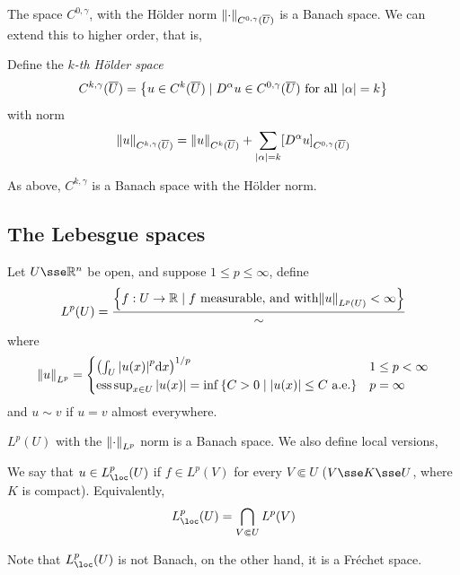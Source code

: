 \documentclass{article}
\begin{document}
The space \(C^{0, \gamma}\), with the H\"older norm \(\norm{\cdot}_{C^{0, \gamma}(\overline U)}\) is a Banach space. We can extend this to higher order, that is,

\begin{definition}
    Define the \emph{\(k\)-th H\"older space}
    \[C^{k, \gamma}(\overline U) = \left\{u \in C^k(\overline U) \mid D^\alpha u \in C^{0, \gamma}(\overline U) \text{ for all }\abs{\alpha} = k\right\}\]
    with norm
    \[\norm{u}_{C^{k, \gamma}(\overline U)} = \norm{u}_{C^k(\overline U)} + \sum_{\abs{\alpha} = k}[D^\alpha u]_{C^{0, \gamma}(\overline U)}\]
\end{definition}

As above, \(C^{k, \gamma}\) is a Banach space with the H\"older norm.

\subsection{The Lebesgue spaces}


\begin{definition}
    [\(L^p\) space]
    Let \(U \sse \R^n\) be open, and suppose \(1 \le p \le \infty\), define 
    \[L^p(U) = \frac{\left\{f : U \to \mathbb{R} \mid f \text{ measurable, and with} \norm{u}_{L^p(U)} < \infty\right\}}{\sim}\]
    where
    \[\norm{u}_{L^p} = \begin{cases}
        \left(\int_U \abs{u(x)}^p\dd x\right)^{1/p} & 1 \le p < \infty \\
        \operatorname*{ess\,sup}_{x \in U}\abs{u(x)} = \inf\left\{C > 0 \mid \abs{u(x)} \le C \text{ a.e.}\right\} & p = \infty
    \end{cases}\]
    and \(u \sim v\) if \(u = v\) almost everywhere.
\end{definition}

\(L^p(U)\) with the \(\norm{\cdot}_{L^p}\) norm is a Banach space. We also define local versions,

\begin{definition}
    We say that \(u \in L^p_\loc(U)\) if \(f \in L^p(V)\) for every \(V \Subset U\) (\(V \sse K \sse U\), where \(K\) is compact). Equivalently,
    \[L^p_\loc(U) = \bigcap_{V \Subset U}L^p(V)\]
\end{definition}

Note that \(L^p_\loc(U)\) is not Banach, on the other hand, it is a Fr\'echet space.
\end{document}
